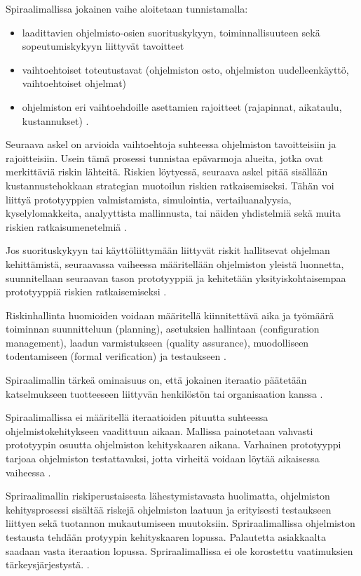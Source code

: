 \documentclass[finnish]{tktltiki2}
\theoremstyle{definition}
\theoremstyle{remark}
\begin{document}
Spiraalimallissa jokainen vaihe aloitetaan tunnistamalla:
\begin{itemize}
  \item laadittavien ohjelmisto-osien suorituskykyyn, toiminnallisuuteen sekä sopeutumiskykyyn liittyvät tavoitteet
  \item vaihtoehtoiset toteutustavat (ohjelmiston osto, ohjelmiston uudelleenkäyttö, vaihtoehtoiset ohjelmat)
  \item ohjelmiston eri vaihtoehdoille asettamien rajoitteet (rajapinnat, aikataulu, kustannukset) \cite{BOE88}.
\end{itemize}

Seuraava askel on arvioida vaihtoehtoja suhteessa ohjelmiston tavoitteisiin ja rajoitteisiin. Usein tämä prosessi tunnistaa epävarmoja alueita, jotka ovat merkittäviä riskin lähteitä. Riskien löytyessä, seuraava askel pitää sisällään kustannustehokkaan strategian muotoilun riskien ratkaisemiseksi. Tähän voi liittyä prototyyppien valmistamista, simulointia, vertailuanalyysia, kyselylomakkeita, analyyttista mallinnusta, tai näiden yhdistelmiä sekä muita riskien ratkaisumenetelmiä \cite{BOE88}.

Jos suorituskykyyn tai käyttöliittymään liittyvät riskit hallitsevat ohjelman kehittämistä, seuraavassa vaiheessa määritellään ohjelmiston yleistä luonnetta, suunnitellaan seuraavan tason prototyyppiä ja kehitetään yksityiskohtaisempaa prototyyppiä riskien ratkaisemiseksi \cite{BOE88}.

Riskinhallinta huomioiden voidaan määritellä kiinnitettävä aika ja työmäärä toiminnan suunnitteluun (planning), asetuksien hallintaan (configuration management), laadun varmistukseen (quality assurance), muodolliseen todentamiseen (formal verification) ja testaukseen \cite{BOE88}.

Spiraalimallin tärkeä ominaisuus on, että jokainen iteraatio päätetään katselmukseen tuotteeseen liittyvän henkilöstön tai organisaation kanssa \cite{BOE88}.


Spiraalimallissa ei määritellä iteraatioiden pituutta suhteessa ohjelmistokehitykseen vaadittuun aikaan. Mallissa painotetaan vahvasti prototyypin osuutta ohjelmiston kehityskaaren aikana. Varhainen prototyyppi tarjoaa ohjelmiston testattavaksi, jotta virheitä voidaan löytää aikaisessa vaiheessa \cite{BOE88}.

Spriraalimallin riskiperustaisesta lähestymistavasta huolimatta, ohjelmiston kehitysprosessi sisältää riskejä ohjelmiston laatuun ja erityisesti testaukseen liittyen sekä tuotannon mukautumiseen muutoksiin. Spriraalimallissa ohjelmiston testausta tehdään protyypin kehityskaaren lopussa. Palautetta asiakkaalta saadaan vasta iteraation lopussa. Spriraalimallissa ei ole korostettu vaatimuksien tärkeysjärjestystä.   \cite{BOE88}. 
\end{document}

